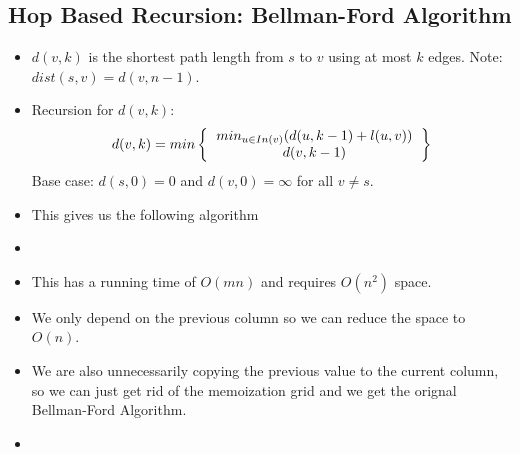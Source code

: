 \documentclass[12pt]{article}
\begin{document}
\subsection{Hop Based Recursion: Bellman-Ford Algorithm}
\begin{itemize}
    \item $d(v, k)$ is the shortest path length from $s$ to $v$ using at most $k$ edges. Note: $dist(s, v) = d(v, n - 1)$.
    \item Recursion for $d(v, k)$: \begin{equation}
        d(v, k) = min \left\{
            \begin{tabular}{c}
                $min_{u \in In(v)}(d(u, k - 1) + l(u, v))$ \\
                $d(v, k - 1)$ \\
            \end{tabular}
        \right\}
    \end{equation}
    Base case: $d(s, 0) = 0$ and $d(v, 0) = \infty$ for all $v \neq s$.
    \item This gives us the following algorithm
    \item[] 
    \item This has a running time of $O(mn)$ and requires $O(n^2)$ space.
    \item We only depend on the previous column so we can reduce the space to $O(n)$.
    \item We are also unnecessarily copying the previous value to the current column, so we can just get rid of the memoization grid and we get the orignal Bellman-Ford Algorithm.
    \item[] 
\end{itemize}
\end{document}
